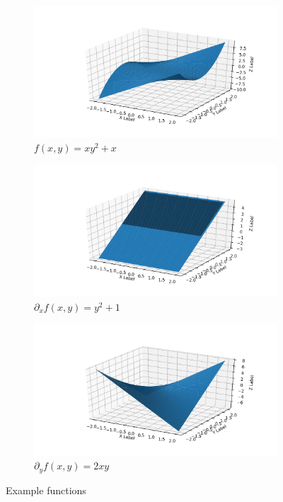 \documentclass[12pt, letterpaper]{article}
\begin{document}
\begin{figure}[t]
  \centering
  \begin{subfigure}[b]{.6\linewidth}
    \includegraphics[width=\linewidth]{Basics/multifn}
    \caption{$f(x,y) = xy^2 + x$}
  \end{subfigure}

  \begin{subfigure}[b]{.4\linewidth}
    \includegraphics[width=\linewidth]{Basics/partDervX}
    \caption{$\partial_x f(x,y) = y^2 + 1$}
  \end{subfigure}
  \begin{subfigure}[b]{.4\linewidth}
    \includegraphics[width=\linewidth]{Basics/partDervY}
    \caption{$\partial_y f(x,y) = 2xy$}
  \end{subfigure}
  \caption{Example functions}
\end{figure}
\end{document}
